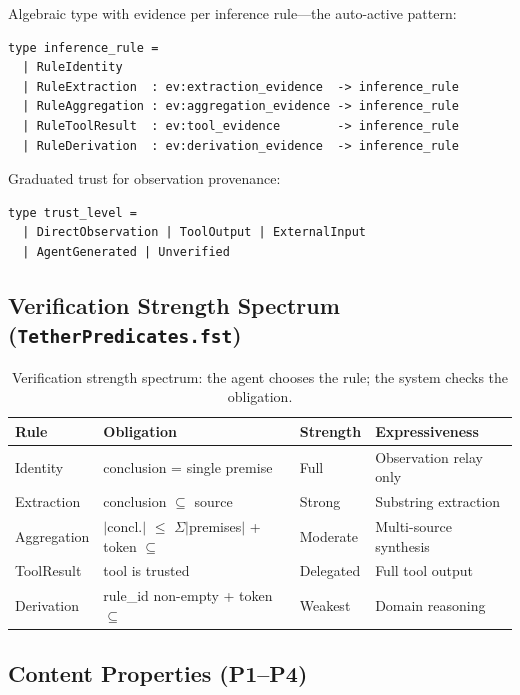 \documentclass[sigplan,screen,nonacm]{acmart}
\begin{document}
Algebraic type with evidence per inference rule---the auto-active pattern:

\begin{lstlisting}[language=fstar,caption={Inference rule algebraic type with per-variant evidence.},label={lst:rule}]
type inference_rule =
  | RuleIdentity
  | RuleExtraction  : ev:extraction_evidence  -> inference_rule
  | RuleAggregation : ev:aggregation_evidence -> inference_rule
  | RuleToolResult  : ev:tool_evidence        -> inference_rule
  | RuleDerivation  : ev:derivation_evidence  -> inference_rule
\end{lstlisting}

Graduated trust for observation provenance:

\begin{lstlisting}[language=fstar,caption={Trust levels for observation sources.},label={lst:trust}]
type trust_level =
  | DirectObservation | ToolOutput | ExternalInput
  | AgentGenerated | Unverified
\end{lstlisting}

\subsection{Verification Strength Spectrum (\texttt{TetherPredicates.fst})}

\begin{table}[t]
\caption{Verification strength spectrum: the agent chooses the rule; the system checks the obligation.}
\label{tab:spectrum}
\small
\begin{tabular}{@{}llll@{}}
\toprule
\textbf{Rule} & \textbf{Obligation} & \textbf{Strength} & \textbf{Expressiveness} \\
\midrule
Identity    & conclusion = single premise   & Full     & Observation relay only \\
Extraction  & conclusion $\subseteq$ source & Strong   & Substring extraction \\
Aggregation & $|$concl.$|$ $\leq$ $\Sigma|$premises$|$ + token $\subseteq$ & Moderate & Multi-source synthesis \\
ToolResult  & tool is trusted               & Delegated & Full tool output \\
Derivation  & rule\_id non-empty + token $\subseteq$ & Weakest & Domain reasoning \\
\bottomrule
\end{tabular}
\end{table}

\subsection{Content Properties (P1--P4)}
\end{document}
